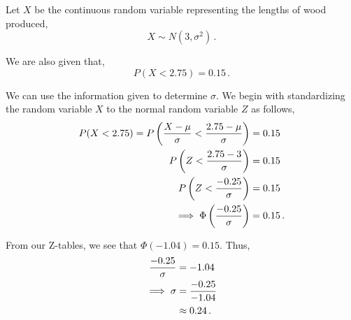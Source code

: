 %
%


\begin{subquestions}

\subquestion

Let $X$ be the continuous random variable representing the lengths of wood produced,
\begin{equation}
	X \sim N(3, \sigma^2) \,.
\end{equation}	

We are also given that,
\begin{equation}
	P(X<2.75) = 0.15 \,.
\end{equation}
	
\begin{subsubquestions}
	
\subsubquestion

We can use the information given to determine $\sigma$.	
We begin with standardizing the random variable $X$ to the normal random variable $Z$ as follows,
\begin{align}
	P(X<2.75) = P\left(\frac{X - \mu}{\sigma}<\frac{2.75-\mu}{\sigma}\right) & = 0.15 \nonumber \\
	            P\left(Z <\frac{2.75-3}{\sigma}\right) & = 0.15 \nonumber \\
	            P\left(Z <\frac{-0.25}{\sigma}\right) & = 0.15 \nonumber \\
	            \implies \Phi\left(\frac{-0.25}{\sigma}\right) & = 0.15 \,.
\end{align}

From our Z-tables, we see that $\Phi(-1.04)=0.15$. Thus, 
\begin{align}
	\frac{-0.25}{\sigma} & = -1.04 \nonumber \\
	\implies \sigma & = \frac{-0.25}{-1.04} \nonumber \\
	                & \approx 0.24 \,.
\end{align}


\end{subsubquestions}
\end{subquestions}
